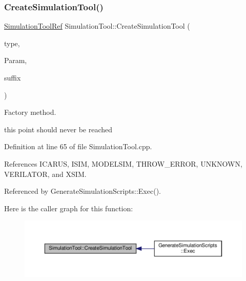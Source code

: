 \subsubsection{\texorpdfstring{Create\+Simulation\+Tool()}{CreateSimulationTool()}}
{\footnotesize\ttfamily \hyperlink{SimulationTool_8hpp_ac6ee25f5bd64bf5c2795c731e142d3c6}{Simulation\+Tool\+Ref} Simulation\+Tool\+::\+Create\+Simulation\+Tool (\begin{DoxyParamCaption}\item[{\hyperlink{classSimulationTool_a6f5b094bef3306e5611c0a3a9ade0a0c}{type\+\_\+t}}]{type,  }\item[{const \hyperlink{Parameter_8hpp_a37841774a6fcb479b597fdf8955eb4ea}{Parameter\+Const\+Ref} \&}]{Param,  }\item[{const std\+::string \&}]{suffix }\end{DoxyParamCaption})\hspace{0.3cm}{\ttfamily [static]}}



Factory method. 

this point should never be reached 

Definition at line 65 of file Simulation\+Tool.\+cpp.



References I\+C\+A\+R\+US, I\+S\+IM, M\+O\+D\+E\+L\+S\+IM, T\+H\+R\+O\+W\+\_\+\+E\+R\+R\+OR, U\+N\+K\+N\+O\+WN, V\+E\+R\+I\+L\+A\+T\+OR, and X\+S\+IM.



Referenced by Generate\+Simulation\+Scripts\+::\+Exec().

Here is the caller graph for this function\+:
\nopagebreak
\begin{figure}[H]
\begin{center}
\leavevmode
\includegraphics[width=350pt]{d5/dfc/classSimulationTool_ac6008e072848fe260c350492afc86076_icgraph}
\end{center}
\end{figure}
\mbox{\label{classSimulationTool_a8e8df618d62095f1f87bc4b61282c563}} 
